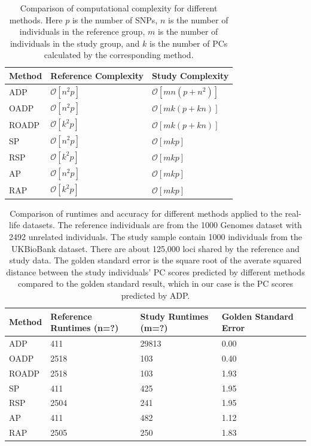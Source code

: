 \documentclass{article}
\newcommand{\bO}{\mathcal{O}}
\begin{document}
\begin{table} 
  \centering
  \begin{tabular}{|l|l|l|}
    \hline
    Method & Reference Complexity & Study Complexity \\ 
    \hline
    ADP & $\bO[n^2 p]$ & $\bO[mn(p + n^2)]$ \\
    \hline
    OADP & $\bO[n^2 p]$ & $\bO[mk(p + k n)]$ \\
    \hline
    ROADP & $\bO[k^2 p]$ & $\bO[mk(p + k n)]$ \\
    \hline
    SP & $\bO[n^2p]$ & $\bO[mkp]$ \\
    \hline
    RSP & $\bO[k^2p]$ & $\bO[mkp]$ \\
    \hline
    AP & $\bO[n^2p]$ &  $\bO[mkp]$ \\
    \hline
    RAP & $\bO[k^2p]$ &  $\bO[mkp]$ \\
    \hline
  \end{tabular}
  \caption{
    Comparison of computational complexity for different methods.
    Here $p$ is the number of SNPs,
    $n$ is the number of individuals in the reference group,
    $m$ is the number of individuals in the  study group,
    and $k$ is the number of PCs calculated by the corresponding method.
  }
  \label{tbl:cplx}
\end{table}

\begin{table} 
  \centering
  \begin{tabular}{|l|l|l|l|l|}
    \hline
    Method & Reference Runtimes (n=?) & Study Runtimes (m=?)& Golden Standard Error \\ 
    \hline
    ADP & 411 & 29813 & 0.00 \\
    \hline
    OADP & 2518 & 103 & 0.40 \\
    \hline
    ROADP & 2518 & 103 & 1.93 \\
    \hline
    SP & 411 & 425 & 1.95 \\
    \hline
    RSP & 2504 & 241 & 1.95 \\
    \hline
    AP & 411 & 482 & 1.12 \\
    \hline
    RAP & 2505 & 250 & 1.83 \\ 
    \hline
  \end{tabular}
  \caption{
    Comparison of runtimes and accuracy for different methods applied to the real-life datasets.
    The reference individuals are from the 1000 Genomes dataset with 2492 unrelated individuals.
    The study sample contain 1000 individuals from the UKBioBank dataset.
    There are about 125,000 loci shared by the reference and study data.
    The golden standard error is the square root of the averate squared distance between the study individuals' PC scores predicted by different methods compared to the golden standard result, which in our case is the PC scores predicted by ADP.
  }
  \label{tbl:ukb}
\end{table} 
\end{document}

